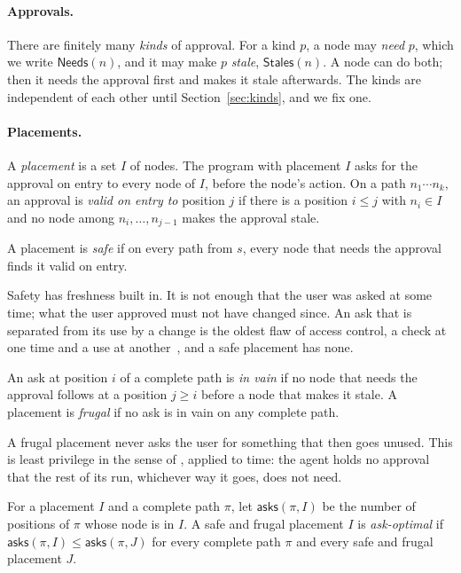 \documentclass[acmsmall,nonacm,screen]{acmart}
\newcommand{\kw}[1]{\mathsf{#1}}
\newcommand{\Needs}{\kw{Needs}}
\newcommand{\Stales}{\kw{Stales}}
\newcommand{\asks}{\kw{asks}}
\begin{document}
\paragraph{Approvals.} There are finitely many \emph{kinds} of approval. For a kind $p$, a
node may \emph{need} $p$, which we write $\Needs(n)$, and it may make $p$ \emph{stale},
$\Stales(n)$. A node can do both; then it needs the approval first and makes it stale
afterwards. The kinds are independent of each other until Section~\ref{sec:kinds}, and we
fix one.

\paragraph{Placements.} A \emph{placement} is a set $I$ of nodes. The program with placement
$I$ asks for the approval on entry to every node of $I$, before the node's action. On a
path $n_1 \cdots n_k$, an approval is \emph{valid on entry to} position $j$ if there is a
position $i \le j$ with $n_i \in I$ and no node among $n_i, \ldots, n_{j-1}$ makes the
approval stale.

\begin{definition}[Safe]
\label{def:safe}
A placement is \emph{safe} if on every path from $s$, every node that needs the approval
finds it valid on entry.
\end{definition}

Safety has freshness built in. It is not enough that the user was asked at some time; what
the user approved must not have changed since. An ask that is separated from its use by a
change is the oldest flaw of access control, a check at one time and a use at
another~\cite{mcphee1974}, and a safe placement has none.

\begin{definition}
\label{def:frugal}
An ask at position $i$ of a complete path is \emph{in vain} if no node that needs the
approval follows at a position $j \ge i$ before a node that makes it stale. A placement is
\emph{frugal} if no ask is in vain on any complete path.
\end{definition}

A frugal placement never asks the user for something that then goes unused. This is least
privilege in the sense of \citet{saltzer1975}, applied to time: the agent holds no approval
that the rest of its run, whichever way it goes, does not need.

\begin{definition}
\label{def:optimal}
For a placement $I$ and a complete path $\pi$, let $\asks(\pi, I)$ be the number of
positions of $\pi$ whose node is in $I$. A safe and frugal placement $I$ is
\emph{ask-optimal} if $\asks(\pi, I) \le \asks(\pi, J)$ for every complete path $\pi$ and
every safe and frugal placement $J$.
\end{definition}
\end{document}
